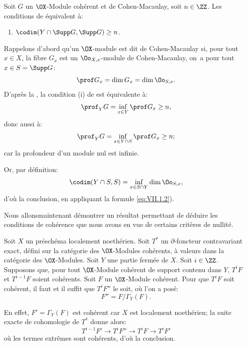 \begin{corollaire}\label{VII.1.4}
Soit $G$ un $\OX$-Module coh\'erent et de Cohen-Macaulay, soit $n \in \ZZ$. Les conditions de  \'equivalent \`a:
\begin{enumerate}
\item[\textup{(v)}]\hfill$\codim(Y \cap \Supp G, \Supp G) \geq n$.\hfill\null
\end{enumerate}
\end{corollaire}
\setcounter{equation}{1}
Rappelons d'abord qu'un $\OX$-module est dit de Cohen-Macaulay si, pour tout $x \in X$, la fibre $G_x$ est un $\Oo_{X, x}$-module de Cohen-Macaulay, \ie on~a pour tout $x \in S = \Supp G$:
\begin{equation}\label{eq:VII.1.2}
\prof G_x = \dim G_x = \dim \Oo_{S, x}.
\end{equation}
D'apr\`es la , la condition (i) de  est \'equivalente \`a:
\begin{equation}\label{eq:VII.1.3} \prof_Y G = \inf_{x\in Y} \prof G_x \geq n,
\end{equation}
donc aussi \`a:
\[
\prof_Y G = \inf_{x \in Y \cap S} \prof G_x \geq n;
\]
car la profondeur d'un module nul est infinie.

Or, par d\'efinition:
\[
\codim (Y \cap S, S) = \inf_{x \in S \cap Y} \dim \Oo_{S, x},
\]
d'o\`u la conclusion, en appliquant la formule \eqref{eq:VII.1.2}).

Nous allons\pageoriginale maintenant d\'emontrer un r\'esultat permettant de d\'eduire les conditions de coh\'erence que nous avons en vue de certains crit\`eres de nullit\'e.

\begin{lemme}\label{VII.1.5}
Soit $X$ un pr\'esch\'ema localement noeth\'erien. Soit $T^{\ast}$ un $\partial$-foncteur contravariant exact, d\'efini sur la cat\'egorie des $\OX$-Modules coh\'erents, \`a valeurs dans la cat\'egorie des $\OX$-Modules. Soit $Y$ une partie ferm\'ee de $X$. Soit $i \in \ZZ$. Supposons que, pour tout $\OX$-Module coh\'erent de support contenu dans $Y$, $T^i F$ et $T^{i-1} F$ soient coh\'erents. Soit $F$ un $\OX$-Module coh\'erent. Pour que $T^i F$ soit coh\'erent, il faut et il suffit que $T^i F''$ le soit, o\`u l'on a pos\'e:
\[
F'' = F / \Gamma_Y (F).
\]
\end{lemme}

En effet, $F' = \Gamma_Y (F)$ est coh\'erent car $X$ est localement noeth\'erien; la suite exacte de cohomologie de $T^{\ast}$ donne alors:
\[
T^{i-1}F' \to T^i F'' \to T^i F \to T^i F'
\]
o\`u les termes extr\^emes sont coh\'erents, d'o\`u la conclusion.

